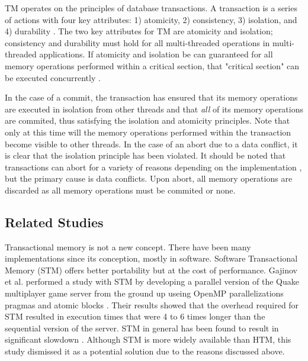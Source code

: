 \documentclass[a4paper]{article}
\begin{document}
\indent TM operates on the principles of database transactions.  A transaction
is a series of actions with four key attributes: 1) atomicity, 2) consistency,
3) isolation, and 4) durability \cite{tm_2nd}.  The two key attributes for TM
are atomicity and isolation; consistency and durability must hold for all
multi-threaded operations in multi-threaded applications.  If atomicity and
isolation be can guaranteed for all memory operations performed within a
critical section, that "critical section" can be executed concurrently
\cite{sle_rajwar}.\par 

\indent In the case of a commit, the transaction has ensured that its memory
operations are executed in isolation from other threads and that \textit{all} of its
memory operations are commited, thus satisfying the isolation and
atomicity principles.  Note that only at this time will the memory operations
performed within the transaction become visible to other threads.  In the case
of an abort due to a data conflict, it is clear that the isolation principle has
been violated.  It should be noted that transactions can abort for a variety of
reasons depending on the implementation \cite{intel_opt_man,chung_amd}, but the
primary cause is data conflicts.  Upon abort, all memory operations are
discarded as all memory operations must be commited or none.\par

\subsection{\textbf{Related Studies}}

\indent Transactional memory is not a new concept.  There have been many
implementations since its conception, mostly in software.  Software
Transactional Memory (STM) offers better portability but at the cost of
performance.  Gajinov et al. performed a study with STM by developing a parallel
version of the Quake multiplayer game server from the ground up useing OpenMP
parallelizations pragmas and atomic blocks \cite{quake_stm}.  Their results
showed that the overhead required for STM resulted in execution times that were
4 to 6 times longer than the sequential version of the server.  STM in general
has been found to result in significant slowdown \cite{stm_cascaval}.  Although
STM is more widely available than HTM, this study dismissed it as a potential
solution due to the reasons discussed above.\par
\end{document}
